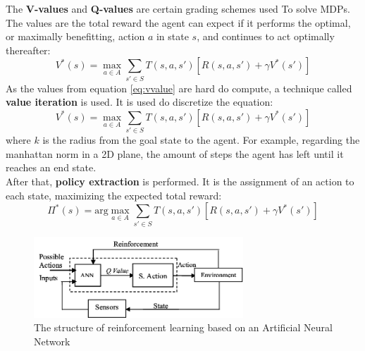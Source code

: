 \documentclass[a4paper]{article}
\begin{document}
	The \textbf{V-values} and \textbf{Q-values} are certain grading schemes used To solve MDPs. The values are the total reward the agent can expect if it performs the optimal, or maximally benefitting, action $a$ in state $s$, and continues to act optimally thereafter:
	\begin{equation}\label{eq:vvalue}
	V^*(s) = \max_{a \in A} \sum_{s' \in S}^{} T(s,a,s')[R(s,a,s')+\gamma V^*(s')]
	\end{equation}
	As the values from equation \ref{eq:vvalue} are hard do compute, a technique called \textbf{value iteration} is used. It is used do discretize the equation: 
	\begin{equation}\label{eq:value-iteration}
	V^*(s) = \max_{a \in A} \sum_{s' \in S}^{} T(s,a,s')[R(s,a,s')+\gamma V^*(s')]
	\end{equation}
	where $k$ is the radius from the goal state to the agent. For example, regarding the manhattan norm in a 2D plane, the amount of steps the agent has left until it reaches an end state.\\
	After that, \textbf{policy extraction} is performed. It is the assignment of an action to each state, maximizing the expected total reward:
	\begin{equation}
	\Pi^*(s) = \text{arg}\max_{a \in A} \sum_{s' \in S}^{} T(s,a,s')[R(s,a,s')+\gamma V^*(s')]
	\end{equation}
	\begin{figure}[t]
		\centering
		\includegraphics[angle=0,width=0.7\textwidth]{./figs/RL_ANN.png}
		\caption{\label{fig:qlearn}The structure of reinforcement learning based on an Artificial Neural Network \citep{HatemRL}}
	\end{figure}
\end{document}
